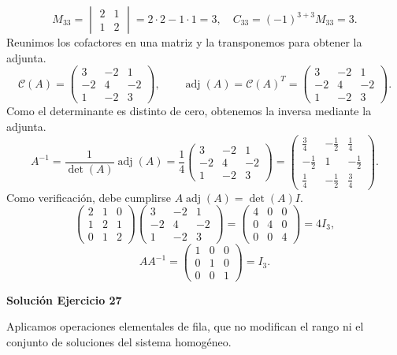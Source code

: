 \documentclass[12pt]{article}
\theoremstyle{remark}
\newcommand{\adj}{\operatorname{adj}}
\begin{document}
\[
M_{33}=\begin{vmatrix}2&1\\1&2\end{vmatrix}=2\cdot 2-1\cdot 1=3,\quad C_{33}=(-1)^{3+3}M_{33}=3.
\]
Reunimos los cofactores en una matriz y la transponemos para obtener la adjunta.
\[
\mathcal{C}(A)=\begin{pmatrix}3&-2&1\\-2&4&-2\\1&-2&3\end{pmatrix},\qquad\adj(A)=\mathcal{C}(A)^T=\begin{pmatrix}3&-2&1\\-2&4&-2\\1&-2&3\end{pmatrix}.
\]
Como el determinante es distinto de cero, obtenemos la inversa mediante la adjunta.
\[
A^{-1}=\frac1{\det(A)}\adj(A)=\frac1{4}\begin{pmatrix}3&-2&1\\-2&4&-2\\1&-2&3\end{pmatrix}=\begin{pmatrix}\frac{3}{4}&- \frac{1}{2}&\frac{1}{4}\\- \frac{1}{2}&1&- \frac{1}{2}\\\frac{1}{4}&- \frac{1}{2}&\frac{3}{4}\end{pmatrix}.
\]
Como verificación, debe cumplirse $A\adj(A)=\det(A)I$.
\[
\begin{pmatrix}2&1&0\\1&2&1\\0&1&2\end{pmatrix}\begin{pmatrix}3&-2&1\\-2&4&-2\\1&-2&3\end{pmatrix}=\begin{pmatrix}4&0&0\\0&4&0\\0&0&4\end{pmatrix}=4I_{3},
\]
\[
AA^{-1}=\begin{pmatrix}1&0&0\\0&1&0\\0&0&1\end{pmatrix}=I_{3}.
\]

\par\bigskip\noindent\textbf{Solución Ejercicio 27}\par\nobreak
Aplicamos operaciones elementales de fila, que no modifican el rango ni el conjunto de soluciones del sistema homogéneo.
\end{document}
